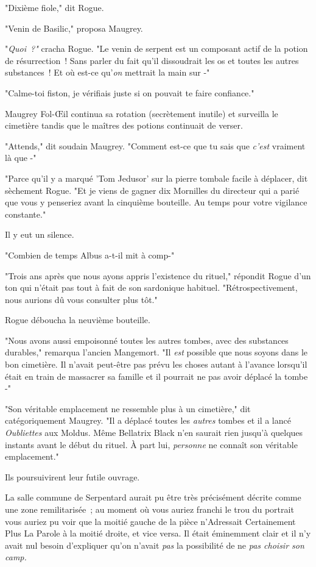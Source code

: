 "Dixième fiole," dit Rogue.

"Venin de Basilic," proposa Maugrey.

"\emph{Quoi~?"} cracha Rogue. "Le venin de serpent est un composant actif de la potion de résurrection~! Sans parler du fait qu'il dissoudrait les os et toutes les autres substances~! Et où est-ce qu'\emph{on} mettrait la main sur -"

"Calme-toi fiston, je vérifiais juste si on pouvait te faire confiance."

Maugrey Fol-Œil continua sa rotation (secrètement inutile) et surveilla le cimetière tandis que le maîtres des potions continuait de verser.

"Attends," dit soudain Maugrey. "Comment est-ce que tu sais que \emph{c'est} vraiment là que -"

"Parce qu'il y a marqué 'Tom Jedusor' sur la pierre tombale facile à déplacer, dit sèchement Rogue. "Et je viens de gagner dix Mornilles du directeur qui a parié que vous y penseriez avant la cinquième bouteille. Au temps pour votre vigilance constante."

Il y eut un silence.

"Combien de temps Albus a-t-il mit à comp-"

"Trois ans après que nous ayons appris l'existence du rituel," répondit Rogue d'un ton qui n'était pas tout à fait de son sardonique habituel. "Rétrospectivement, nous aurions dû vous consulter plus tôt."

Rogue déboucha la neuvième bouteille.

"Nous avons aussi empoisonné toutes les autres tombes, avec des substances durables," remarqua l'ancien Mangemort. "Il \emph{est} possible que nous soyons dans le bon cimetière. Il n'avait peut-être pas prévu les choses autant à l'avance lorsqu'il était en train de massacrer sa famille et il pourrait ne pas avoir déplacé la tombe -"

"Son véritable emplacement ne ressemble plus à un cimetière," dit catégoriquement Maugrey. "Il a déplacé toutes les \emph{autres} tombes et il a lancé \emph{Oubliettes} aux Moldus. Même Bellatrix Black n'en saurait rien jusqu'à quelques instants avant le début du rituel. À part lui, \emph{personne} ne connaît son véritable emplacement."

Ils poursuivirent leur futile ouvrage.


La salle commune de Serpentard aurait pu être très précisément décrite comme une zone remilitarisée~; au moment où vous auriez franchi le trou du portrait vous auriez pu voir que la moitié gauche de la pièce n'Adressait Certainement Plus La Parole à la moitié droite, et vice versa. Il était éminemment clair et il n'y avait nul besoin d'expliquer qu'on n'avait \emph{pas} la possibilité de ne \emph{pas choisir son camp.}


